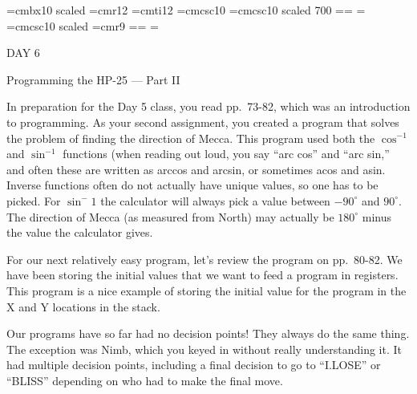 
\def\folio{\ifnum\pageno>0 \number\pageno \else
   \ifnum\pageno<0 \romannumeral-\pageno \else\fi\fi}

\font\largebf=cmbx10  scaled 
\font\largerm=cmr12
\font\largeit=cmti12
\font\tensc=cmcsc10
\font\sevensc=cmcsc10 scaled 700
\newfam\scfam \def\sc{\fam\scfam\tensc}
\textfont\scfam=\tensc \scriptfont\scfam=\sevensc
\scriptscriptfont\scfam=\sevensc
\font\largesc=cmcsc10 scaled 
\font\ninerm=cmr9
\newfam\srfam \def\sr{\fam\srfam\ninerm}
\textfont\srfam=\ninerm \scriptfont\srfam=\sevenrm
\scriptscriptfont\srfam=\fiverm




\null\vskip36pt

\centerline{\largerm DAY 6}
\nobreak\bigskip

\centerline{\largeit Programming the HP-25 --- Part II}
\nobreak\bigskip


\nobreak\bigskip

In preparation for the Day 5 class, you read pp.~73-82, which was an introduction to programming. As your second assignment, you created a program that solves the problem of finding the direction of Mecca. This program used both the $\cos^{-1}$ and $\sin^{-1}$ functions (when reading out loud, you say ``arc cos'' and ``arc sin,'' and often these are written as arccos and arcsin, or sometimes acos and asin. Inverse functions often do not actually have unique values, so one has to be picked. For $\sin^-1$ the calculator will always pick a value between $-90^{\circ}$ and $90^{\circ}$. The direction of Mecca (as measured from North) may actually be $180^{\circ}$ minus the value the calculator gives.

For our next relatively easy program, let's review the program on pp.~80-82. We have been storing the initial values that we want to feed a program in registers. This program is a nice example of storing the initial value for the program in the X and Y locations in the stack.


\nobreak\bigskip

\noindent Our programs have so far had no decision points! They always do the same thing. The exception was Nimb, which you keyed in without really understanding it. It had multiple decision points, including a final decision to go to ``I.LOSE'' or ``BLISS'' depending on who had to make the final move.

